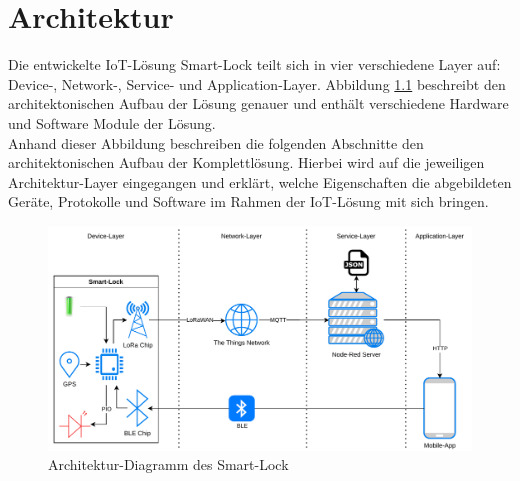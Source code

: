 
\chapter{Architektur}
Die entwickelte \ac{IoT}-Lösung Smart-Lock teilt sich in vier verschiedene Layer auf: Device-, Network-, Service- und Application-Layer. Abbildung \ref{fig:architektur} beschreibt den architektonischen Aufbau der Lösung genauer und enthält verschiedene Hardware und Software Module der Lösung. \\
Anhand dieser Abbildung beschreiben die folgenden Abschnitte den architektonischen Aufbau der Komplettlösung. Hierbei wird auf die jeweiligen Architektur-Layer eingegangen und erklärt, welche Eigenschaften die abgebildeten Geräte, Protokolle und Software im Rahmen der \ac{IoT}-Lösung mit sich bringen.

\begin{figure}[!htbp]
    \centering
    \includegraphics[width=1\linewidth]{images/architecture_smart_lock.pdf}
    \caption[Architektur-Diagramm des Smart-Lock]{Architektur-Diagramm des Smart-Lock}
    \label{fig:architektur}
\end{figure}




